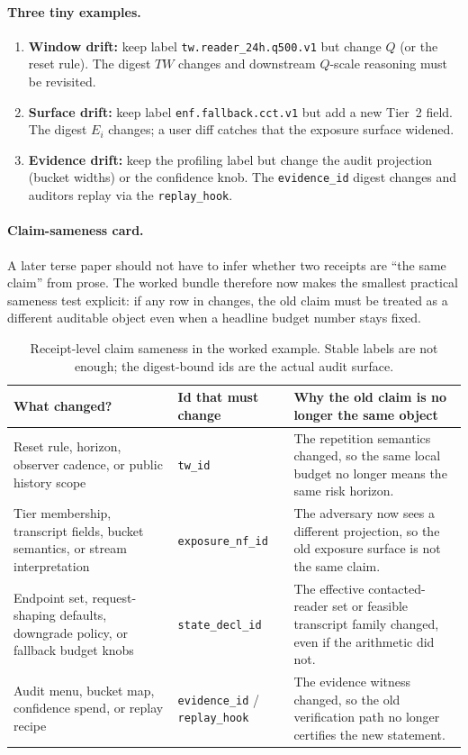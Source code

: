 \documentclass[11pt]{article}
\begin{document}
\paragraph{Three tiny examples.}
\begin{enumerate}[leftmargin=*]
\item \textbf{Window drift:} keep label \texttt{tw.reader\_24h.q500.v1} but change $Q$ (or the reset rule). The digest $TW$ changes and downstream $Q$-scale reasoning must be revisited.\cite{series:threatwindows}
\item \textbf{Surface drift:} keep label \texttt{enf.fallback.cct.v1} but add a new Tier~2 field. The digest $E_i$ changes; a user diff catches that the exposure surface widened.\cite{series:traceifaces}
\item \textbf{Evidence drift:} keep the profiling label but change the audit projection (bucket widths) or the confidence knob. The \texttt{evidence\_id} digest changes and auditors replay via the \texttt{replay\_hook}.\cite{series:receiptitems,series:auditorreplay}
\end{enumerate}

\paragraph{Claim-sameness card.}
A later terse paper should not have to infer whether two receipts are ``the same claim'' from prose.
The worked bundle therefore now makes the smallest practical sameness test explicit: if any row in  changes, the old claim must be treated as a different auditable object even when a headline budget number stays fixed.

\begin{table}[t]
\centering
\small
\begin{tabularx}{\linewidth}{@{}l l X@{}}
\toprule
What changed? & Id that must change & Why the old claim is no longer the same object \\
\midrule
Reset rule, horizon, observer cadence, or public history scope & \texttt{tw\_id} & The repetition semantics changed, so the same local budget no longer means the same risk horizon. \\
Tier membership, transcript fields, bucket semantics, or stream interpretation & \texttt{exposure\_nf\_id} & The adversary now sees a different projection, so the old exposure surface is not the same claim. \\
Endpoint set, request-shaping defaults, downgrade policy, or fallback budget knobs & \texttt{state\_decl\_id} & The effective contacted-reader set or feasible transcript family changed, even if the arithmetic did not. \\
Audit menu, bucket map, confidence spend, or replay recipe & \texttt{evidence\_id} / \texttt{replay\_hook} & The evidence witness changed, so the old verification path no longer certifies the new statement. \\
\bottomrule
\end{tabularx}
\caption{Receipt-level claim sameness in the worked example. Stable labels are not enough; the digest-bound ids are the actual audit surface.}
\label{tab:workedexample-sameness-card}
\end{table}
\end{document}
